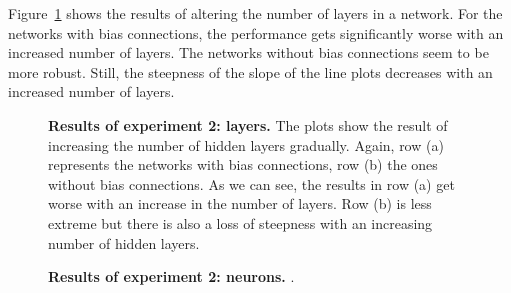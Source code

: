 Figure~\ref{fig:experiment_2_layers} shows the results of altering the number of layers in a network. For the networks with bias connections, the performance gets significantly worse with an increased number of layers. The networks without bias connections seem to be more robust. Still, the steepness of the slope of the line plots decreases with an increased number of layers.
\begin{figure}[!ht]
\begin{figrow}
\item \label{row:NN_with_bias_layers} 
\item \label{row:NN_without_layers}  
\end{figrow}
\caption[Results of experiment 2: layers]{
  \textbf{Results of experiment 2: layers.}
   The plots show the result of increasing the number of hidden layers gradually. Again, row (a) represents the networks with bias connections, row (b) the ones without bias connections. As we can see, the results in row (a) get worse with an increase in the number of layers. Row (b) is less extreme but there is also a loss of steepness with an increasing number of hidden layers.
}
\label{fig:experiment_2_layers}
\end{figure}

\begin{figure}[!ht]
\begin{figrow}
\item \label{row:NN_with_bias_neurons} 
\item \label{row:NN_without_neurons}  
\end{figrow}
\caption[Results of experiment 2: neurons]{
  \textbf{Results of experiment 2: neurons.}
   .
}
\label{fig:experiment_2_neurons}
\end{figure}

